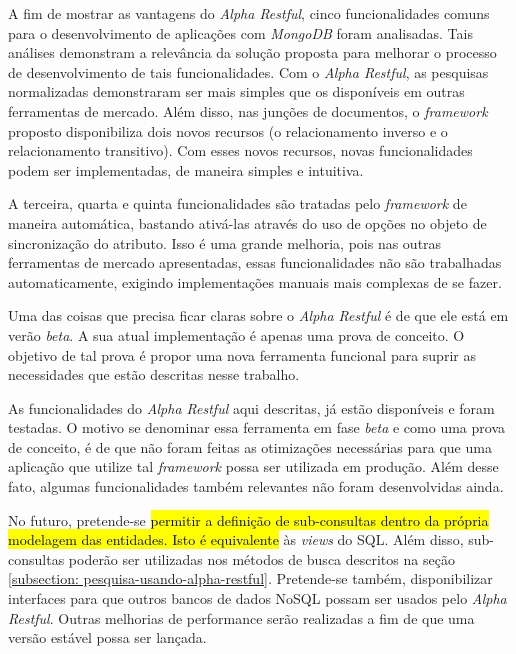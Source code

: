 A fim de mostrar as vantagens do \textit{Alpha Restful}, cinco funcionalidades comuns para o desenvolvimento de aplicações com \textit{MongoDB} foram analisadas. Tais análises demonstram a relevância da solução proposta para melhorar o processo de desenvolvimento de tais funcionalidades. Com o \textit{Alpha Restful}, as pesquisas normalizadas demonstraram ser mais simples que os disponíveis em outras ferramentas de mercado. Além disso, nas junções de documentos, o \textit{framework} proposto disponibiliza dois novos recursos (o relacionamento inverso e o relacionamento transitivo). Com esses novos recursos, novas funcionalidades podem ser implementadas, de maneira simples e intuitiva.

A terceira, quarta e quinta funcionalidades são tratadas pelo \textit{framework} de maneira automática, bastando ativá-las através do uso de opções no objeto de sincronização do atributo. Isso é uma grande melhoria, pois nas outras ferramentas de mercado apresentadas, essas funcionalidades não são trabalhadas automaticamente, exigindo implementações manuais mais complexas de se fazer.

Uma das coisas que precisa ficar claras sobre o \textit{Alpha Restful} é de que ele está em verão \textit{beta}. A sua atual implementação é apenas uma prova de conceito. O objetivo de tal prova é propor uma nova ferramenta funcional para suprir as necessidades que estão descritas nesse trabalho.

As funcionalidades do \textit{Alpha Restful} aqui descritas, já estão disponíveis e foram testadas. O motivo se denominar essa ferramenta em fase \textit{beta} e como uma prova de conceito, é de que não foram feitas as otimizações necessárias para que uma aplicação que utilize tal \textit{framework} possa ser utilizada em produção. Além desse fato, algumas funcionalidades também relevantes não foram desenvolvidas ainda.

No futuro, pretende-se \hl{permitir a definição de sub-consultas dentro da própria modelagem das entidades. Isto é equivalente} às \textit{views} do SQL. Além disso, sub-consultas poderão ser utilizadas nos métodos de busca descritos na seção \ref{subsection: pesquisa-usando-alpha-restful}. Pretende-se também, disponibilizar interfaces para que outros bancos de dados NoSQL possam ser usados pelo \textit{Alpha Restful}. Outras melhorias de performance serão realizadas a fim de que uma versão estável possa ser lançada.

